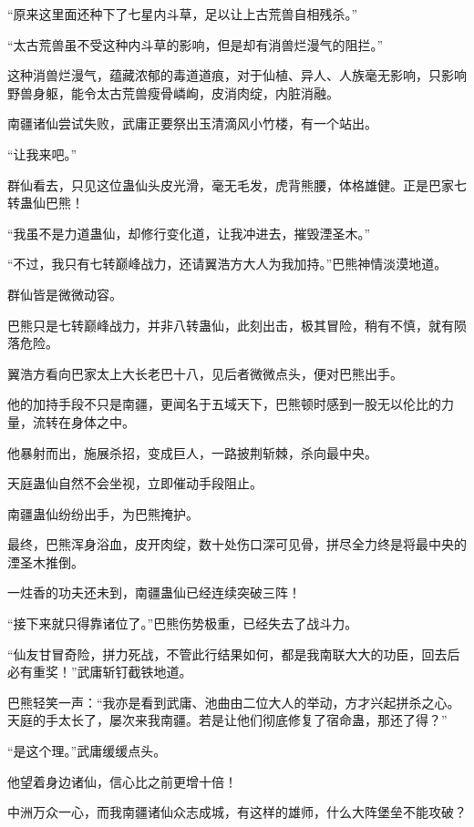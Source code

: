 \begin{this_body}
“原来这里面还种下了七星内斗草，足以让上古荒兽自相残杀。”

“太古荒兽虽不受这种内斗草的影响，但是却有消兽烂漫气的阻拦。”

这种消兽烂漫气，蕴藏浓郁的毒道道痕，对于仙植、异人、人族毫无影响，只影响野兽身躯，能令太古荒兽瘦骨嶙峋，皮消肉绽，内脏消融。

南疆诸仙尝试失败，武庸正要祭出玉清滴风小竹楼，有一个站出。

“让我来吧。”

群仙看去，只见这位蛊仙头皮光滑，毫无毛发，虎背熊腰，体格雄健。正是巴家七转蛊仙巴熊！

“我虽不是力道蛊仙，却修行变化道，让我冲进去，摧毁湮圣木。”

“不过，我只有七转巅峰战力，还请翼浩方大人为我加持。”巴熊神情淡漠地道。

群仙皆是微微动容。

巴熊只是七转巅峰战力，并非八转蛊仙，此刻出击，极其冒险，稍有不慎，就有陨落危险。

翼浩方看向巴家太上大长老巴十八，见后者微微点头，便对巴熊出手。

他的加持手段不只是南疆，更闻名于五域天下，巴熊顿时感到一股无以伦比的力量，流转在身体之中。

他暴射而出，施展杀招，变成巨人，一路披荆斩棘，杀向最中央。

天庭蛊仙自然不会坐视，立即催动手段阻止。

南疆蛊仙纷纷出手，为巴熊掩护。

最终，巴熊浑身浴血，皮开肉绽，数十处伤口深可见骨，拼尽全力终是将最中央的湮圣木推倒。

一炷香的功夫还未到，南疆蛊仙已经连续突破三阵！

“接下来就只得靠诸位了。”巴熊伤势极重，已经失去了战斗力。

“仙友甘冒奇险，拼力死战，不管此行结果如何，都是我南联大大的功臣，回去后必有重奖！”武庸斩钉截铁地道。

巴熊轻笑一声：“我亦是看到武庸、池曲由二位大人的举动，方才兴起拼杀之心。天庭的手太长了，屡次来我南疆。若是让他们彻底修复了宿命蛊，那还了得？”

“是这个理。”武庸缓缓点头。

他望着身边诸仙，信心比之前更增十倍！

中洲万众一心，而我南疆诸仙众志成城，有这样的雄师，什么大阵堡垒不能攻破？

\end{this_body}

